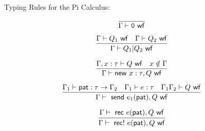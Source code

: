 \documentclass[10pt, letterpaper,proof]{letter}
\begin{document}
Typing Rules for the Pi Calculus:


\[\infer[]{\Gamma \vdash \mathtt{0} \ \mathsf{ wf}}{}\]

\[\infer[]{\Gamma \vdash Q_1 | Q_2 \ \mathsf{ wf}}{\Gamma \vdash Q_1 \ \mathsf{ wf} & \Gamma \vdash Q_2 \ \mathsf{ wf}}\]

\[\infer[]{\Gamma \vdash \mathsf{new}\ x:\tau, Q\ \mathsf{ wf}}{\Gamma, x:\tau \vdash Q \ \mathsf{ wf} & x \notin \Gamma}\]

\[\infer[]{\Gamma \vdash \ \mathsf{send}\ e_1(\mathsf{pat}),Q \ \mathsf{ wf}}{\Gamma_1 \vdash \mathsf{pat}:\tau \rightarrow \Gamma_2 & \Gamma_1 \vdash e:\tau & \Gamma_1\Gamma_2 \vdash Q \ \mathsf{ wf}}\]

\[\infer[]{\Gamma \vdash \ \mathsf{rec}!\ e(\mathsf{pat}),Q \ \mathsf{ wf}}{\Gamma \vdash \ \mathsf{rec}\ e(\mathsf{pat}),Q \ \mathsf{ wf}}\]
\end{document}
